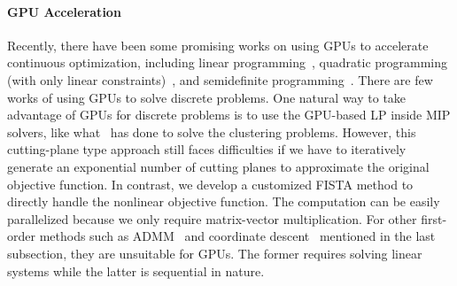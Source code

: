 \paragraph{GPU Acceleration}
Recently, there have been some promising works on using GPUs to accelerate continuous optimization, including linear programming~\cite{applegate2021practical, lu2023cupdlp}, quadratic programming (with only linear constraints)~\cite{lu2023practical}, and semidefinite programming~\cite{han2024accelerating}.
There are few works of using GPUs to solve discrete problems.
One natural way to take advantage of GPUs for discrete problems is to use the GPU-based LP inside MIP solvers, like what~\cite{de2024power} has done to solve the clustering problems.
However, this cutting-plane type approach still faces difficulties if we have to iteratively generate an exponential number of cutting planes to approximate the original objective function.
In contrast, we develop a customized FISTA method to directly handle the nonlinear objective function.
The computation can be easily parallelized because we only require matrix-vector multiplication.
For other first-order methods such as  ADMM~\cite{liu2024okridge} and coordinate descent~\cite{hazimeh2022sparse} mentioned in the last subsection, they are unsuitable for GPUs.
The former requires solving linear systems while the latter is sequential in nature.
